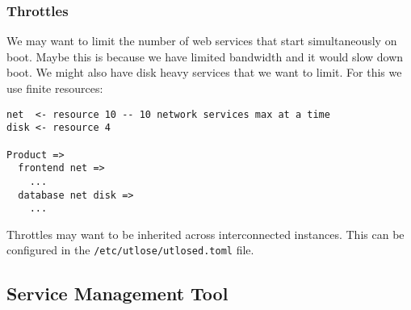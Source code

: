 \documentclass{article}
\newcommand*{\bibtitle}{Bibliography}
\begin{document}
\subsubsection{Throttles}
We may want to limit the number of web services that start simultaneously on boot.
Maybe this is because we have limited bandwidth and it would slow down boot.
We might also have disk heavy services that we want to limit.
For this we use finite resources:

\begin{verbatim}
net  <- resource 10 -- 10 network services max at a time
disk <- resource 4

Product =>
  frontend net =>
    ...
  database net disk =>
    ...
\end{verbatim}
Throttles may want to be inherited across interconnected instances. This can be configured in
the \texttt{/etc/utlose/utlosed.toml} file.

\subsection{Service Management Tool}


\setlength{\baselineskip}{0pt} %

{\renewcommand*\MakeUppercase[1]{#1}%
\printbibliography[heading=bibintoc,title={\bibtitle}]}
\end{document}
